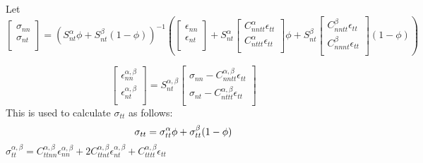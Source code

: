 \documentclass[a4paper,12pt]{article}
\begin{document}
 Let 
\begin{equation}
\begin{bmatrix}
\sigma_{nn}\\
\sigma_{nt}\\
\end{bmatrix}
=\left(S_{nt}^{\alpha}\phi+S_{nt}^{\beta}\left(1-\phi\right)\right)^{-1}\left(
\begin{bmatrix}
  \epsilon_{nn}\\
  \epsilon_{nt}\\
\end{bmatrix}
+
S_{nt}^{\alpha}
\begin{bmatrix}
C_{nntt}^{\alpha}\epsilon_{tt}\\
C_{nttt}^{\alpha}\epsilon_{tt}\\
\end{bmatrix}
\phi
+
S_{nt}^{\beta}
\begin{bmatrix}
C_{nntt}^{\beta}\epsilon_{tt}\\
C_{nnnt}^{\beta}\epsilon_{tt}\\
\end{bmatrix}
(1-\phi)
\right)
\end{equation}

\begin{equation}
\begin{bmatrix}
\epsilon_{nn}^{\alpha,\beta} \\
\epsilon_{nt}^{\alpha,\beta} \\
\end{bmatrix}
=
S_{nt}^{\alpha,\beta}
\begin{bmatrix}
\sigma_{nn}-C_{nntt}^{\alpha,\beta}\epsilon_{tt}\\
\sigma_{nt}-C_{nttt}^{\alpha,\beta}\epsilon_{tt}\\
\end{bmatrix}
\end{equation}
This is used to calculate $\sigma_{tt}$ as follows:
 \begin{equation}
  \sigma_{tt}=\sigma_{tt}^{\alpha}\phi+\sigma_{tt}^{\beta}(1-\phi)\\
  \end{equation}
$\sigma_{tt}^{\alpha,\beta}=C_{ttnn}^{\alpha,\beta}\epsilon_{nn}^{\alpha,\beta}+2C_{ttnt}^{\alpha,\beta}\epsilon_{nt}^{\alpha,\beta}+C_{tttt}^{\alpha,\beta}\epsilon_{tt}$
\end{document}
